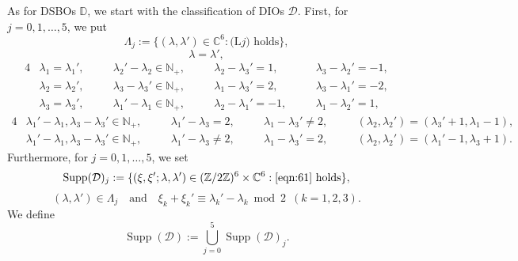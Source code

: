 \documentclass[a4paper,11pt,reqno]{amsart}
\newcommand{\DD}{\mathbb{D}}
\newcommand{\calD}{\mathcal{D}}
\newcommand{\0}{{\bf 0}}
\newcommand{\N}{\mathbb{N}}
\newcommand{\Z}{\mathbb{Z}}
\newcommand{\C}{\mathbb{C}}
\newcommand{\1}{{\bf 1}}
\DeclareMathOperator{\Supp}{Supp}
\theoremstyle{plain}
\theoremstyle{definition}
\numberwithin{equation}{section}
\theoremstyle{definition}
\begin{document}
As for DSBOs $\DD$, we start with the classification of DIOs $\calD$.
First, for $j=0, 1,\ldots, 5$, we put
\begin{equation*}
\Lambda_j := \{(\lambda, \lambda') \in\C^6 : \text{(L$j$) holds}\},
\end{equation*}
\begin{equation}
\lambda=\lambda', \tag{L0}
\end{equation}
\begin{alignat}{4}
&\lambda_1 = \lambda_1', \quad 
&&\lambda_2' - \lambda_2 \in \N_+, \quad
&&\lambda_2 - \lambda_3' = 1, \quad
&&\lambda_3 - \lambda_2' = -1, \tag{L1} \\[3pt]
&\lambda_2 = \lambda_2', \quad 
&&\lambda_3 - \lambda_3' \in \N_+, \quad 
&&\lambda_1 - \lambda_3' = 2, \quad 
&&\lambda_3 - \lambda_1' = -2, \tag{L2}\\[3pt]
&\lambda_3 = \lambda_3', \quad 
&&\lambda_1' - \lambda_1 \in \N_+, \quad 
&&\lambda_2 - \lambda_1' = -1, \quad 
&&\lambda_1 - \lambda_2' = 1, \tag{L3}
\end{alignat}
\begin{alignat}{4}
&\lambda_1' - \lambda_1, \lambda_3 - \lambda_3' \in \N_+,\quad
&&\lambda_1'-\lambda_3 = 2,\quad
&&\lambda_1 - \lambda_3' \neq 2, \quad
&&(\lambda_2, \lambda_2') = (\lambda_3'+1, \lambda_1-1), \tag{L4}\\[3pt]
&\lambda_1' - \lambda_1, \lambda_3 - \lambda_3' \in \N_+,  \quad
&&\lambda_1'-\lambda_3 \neq 2, \quad
&&\lambda_1 - \lambda_3' = 2, \quad
&&(\lambda_2, \lambda_2') = (\lambda_1'-1, \lambda_3+1). \tag{L5}
\end{alignat}
\noindent
Furthermore, for $j=0,1,\ldots, 5$, we set
\begin{equation*}
\Supp(\calD)_j 
:= \{(\xi, \xi'; \lambda, \lambda')\in (\Z/2\Z)^6 \times \C^6: \text{\eqref{eqn:61} holds}\},
\end{equation*}
\vspace{-10pt}
\begin{equation}\label{eqn:61}
(\lambda, \lambda') \in  \Lambda_j
\quad \text{and} \quad 
\xi_k + \xi_k' \equiv \lambda_k' - \lambda_k \bmod{2} \enspace (k = 1, 2, 3).
\end{equation}
We define
\begin{equation*}
\Supp(\calD):=\bigcup_{j=0}^5\Supp(\calD)_j.
\end{equation*}
\end{document}
